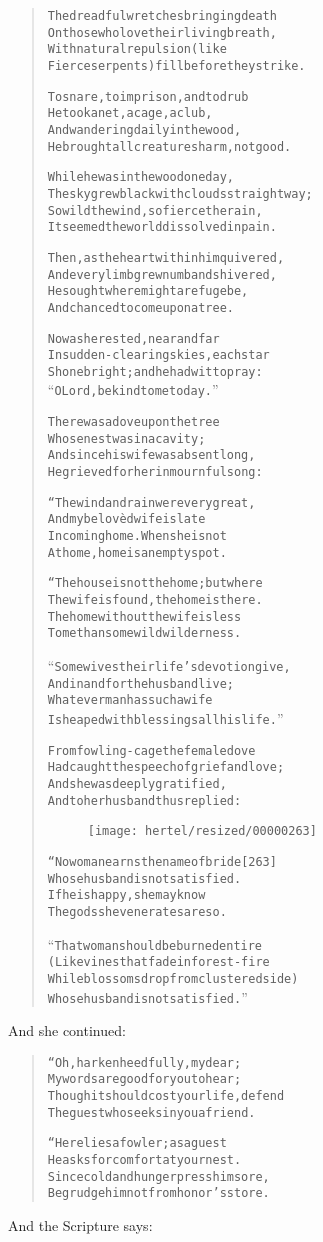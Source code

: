 \documentclass[article, twoside, 10pt]{memoir}
\renewenvironment{verbatim}{%
\begin{quote}%
\vskip -10pt%
\begin{alltt}\normalfont\small}{\end{alltt}%
\end{quote}%
\vskip -10pt
} %
\begin{document}
\begin{verbatim}
The dreadful wretches bringing death
On those who love their living breath,
With natural repulsion (like
Fierce serpents) fill before they strike.

To snare, to imprison, and to drub
He took a net, a cage, a club,
And wandering daily in the wood,
He brought all creatures harm, not good.

While he was in the wood one day,
The sky grew black with clouds straightway;
So wild the wind, so fierce the rain,
It seemed the world dissolved in pain.

Then, as the heart within him quivered,
And every limb grew numb and shivered,
He sought where might a refuge be,
And chanced to come upon a tree.

Now as he rested, near and far
In sudden-clearing skies, each star
Shone bright; and he had wit to pray:
“O Lord, be kind to me today.”

There was a dove upon the tree
Whose nest was in a cavity;
And since his wife was absent long,
He grieved for her in mournful song:

“The wind and rain were very great,
And my belovèd wife is late
In coming home. When she is not
At home, home is an empty spot.

“The house is not the home; but where
The wife is found, the home is there.
The home without the wife is less
To me than some wild wilderness.

“Some wives their life's devotion give,
And in and for the husband live;
Whatever man has such a wife
Is heaped with blessings all his life.”

From fowling-cage the female dove
Had caught the speech of grief and love;
And she was deeply gratified,
And to her husband thus replied:

\begin{figure}[p]\texttt{[image: hertel/resized/00000263]}\end{figure}“No woman earns the name of bride                       [263]
Whose husband is not satisfied.
If he is happy, she may know
The gods she venerates are so.

“That woman should be burned entire
(Like vines that fade in forest-fire
While blossoms drop from clustered side)
Whose husband is not satisfied.”
\end{verbatim}
And she continued:

\begin{verbatim}
“Oh, harken heedfully, my dear;
My words are good for you to hear;
Though it should cost your life, defend
The guest who seeks in you a friend.

“Here lies a fowler; as a guest
He asks for comfort at your nest.
Since cold and hunger press him sore,
Begrudge him not from honor's store.
\end{verbatim}
And the Scripture says:
\end{document}
